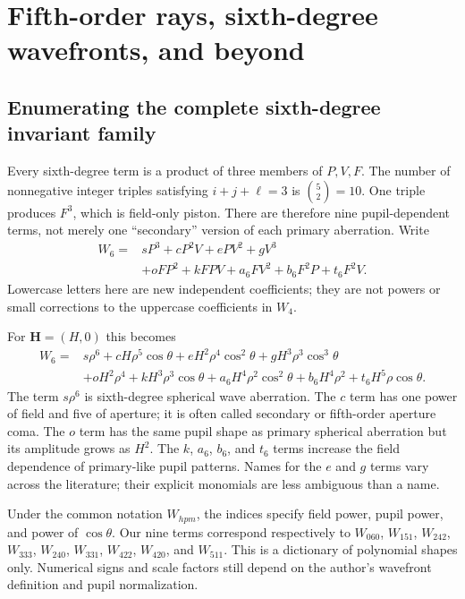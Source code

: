 \chapter{Fifth-order rays, sixth-degree wavefronts, and beyond}
\label{ab:higher}

\section{Enumerating the complete sixth-degree invariant family}
Every sixth-degree term is a product of three members of $P,V,F$. The
number of nonnegative integer triples satisfying $i+j+\ell=3$ is
$\binom{5}{2}=10$. One triple produces $F^3$, which is field-only piston.
There are therefore nine pupil-dependent terms, not merely one ``secondary''
version of each primary aberration. Write
\begin{align}
 W_6={}&sP^3+cP^2V+ePV^2+gV^3\nonumber\\
       &+oFP^2+kFPV+a_6FV^2+b_6F^2P+t_6F^2V.
 \label{ab:W6}
\end{align}
Lowercase letters here are new independent coefficients; they are not
powers or small corrections to the uppercase coefficients in $W_4$.

For $\bm H=(H,0)$ this becomes
\begin{align}
 W_6={}&s\rho^6+cH\rho^5\cos\theta
       +eH^2\rho^4\cos^2\theta+gH^3\rho^3\cos^3\theta\nonumber\\
       &+oH^2\rho^4+kH^3\rho^3\cos\theta
       +a_6H^4\rho^2\cos^2\theta
       +b_6H^4\rho^2+t_6H^5\rho\cos\theta.
 \label{ab:W6polar}
\end{align}
The term $s\rho^6$ is sixth-degree spherical wave aberration. The $c$ term
has one power of field and five of aperture; it is often called secondary
or fifth-order aperture coma. The $o$ term has the same pupil shape as
primary spherical aberration but its amplitude grows as $H^2$. The $k$,
$a_6$, $b_6$, and $t_6$ terms increase the field dependence of primary-like
pupil patterns. Names for the $e$ and $g$ terms vary across the literature;
their explicit monomials are less ambiguous than a name.

Under the common notation $W_{hpm}$, the indices specify field power, pupil
power, and power of $\cos\theta$. Our nine terms correspond respectively to
$W_{060}$, $W_{151}$, $W_{242}$, $W_{333}$, $W_{240}$, $W_{331}$,
$W_{422}$, $W_{420}$, and $W_{511}$. This is a dictionary of polynomial
shapes only. Numerical signs and scale factors still depend on the author's
wavefront definition and pupil normalization.

